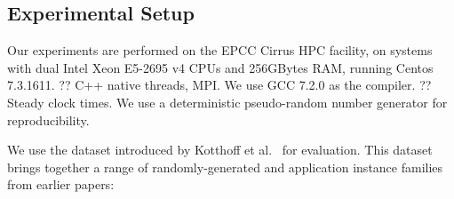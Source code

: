 \documentclass[runningheads]{llncs}
\newcommand{\siplineref}[1]{line~\ref{line:sip:#1}}
\newcommand{\citet}[2]{#1\cite{#2}}
\begin{document}

\subsection{Experimental Setup}

Our experiments are performed on the EPCC Cirrus HPC facility, on systems with dual Intel Xeon
E5-2695 v4 CPUs and 256GBytes RAM, running Centos 7.3.1611. ?? C++ native threads, MPI. We use GCC
7.2.0 as the compiler. ?? Steady clock times. We use a deterministic pseudo-random number generator
for reproducibility.

We use the dataset introduced by \citet{Kotthoff et al.\ }{DBLP:conf/lion/KotthoffMS16} for
evaluation. This dataset brings together a range of randomly-generated and application instance
families from earlier papers:
\end{document}

